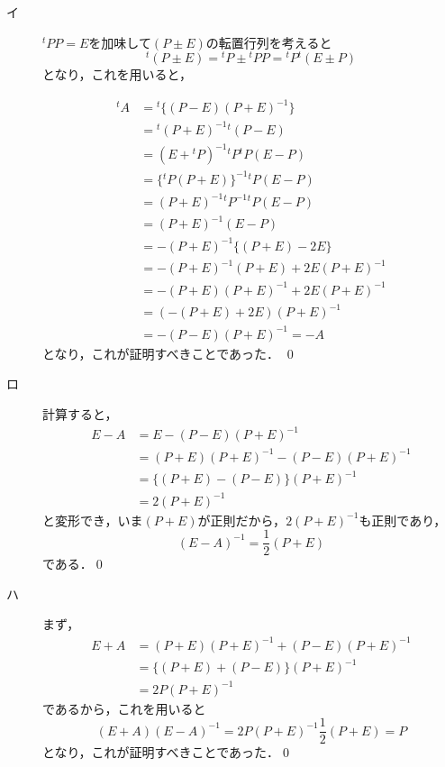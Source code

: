 \documentclass[uplatex,dvipdfmx,a4paper,10pt,fleqn]{jsarticle}
\begin{document}
\begin{leftbar}
    \begin{description}
        \item[イ] ${}^t PP =E$を加味して$(P \pm E)$の転置行列を考えると
        \[
           {}^t (P \pm E) = {}^t P \pm {}^t PP = {}^t P {}^t (E \pm P)
        \]
        となり，これを用いると，

        \begin{align*} 
            {}^t A & ={}^t  \{ (P-E)(P+E)^{-1} \} \\
            & = {}^t (P+E)^{-1} {}^t (P-E) \\
            & = (E+{}^t P)^{-1} {}^t P {}^t P (E-P) \\
            & = \{ {}^t P (P+E)  \}^{-1} {}^t P (E-P) \\
            & = (P+E)^{-1} {}^t P^{-1} {}^t P (E-P) \\
            & = (P+E)^{-1} (E-P) \\
            & = -(P+E)^{-1} \{ (P+E)-2E \} \\
            & = -(P+E)^{-1} (P+E) +2E (P+E)^{-1} \\
            & = -(P+E) (P+E)^{-1} +2E (P+E)^{-1} \\
            & = (-(P+E)+2E) (P+E)^{-1} \\
            & = -(P-E) (P+E)^{-1} = -A
        \end{align*} 
        となり，これが証明すべきことであった． \qed
        \item[ロ] 計算すると，
        \begin{align*} 
            E-A & = E-(P-E) (P+E)^{-1} \\
            & = (P+E)(P+E)^{-1} - (P-E) (P+E)^{-1} \\
            & = \{ (P+E)-(P-E) \} (P+E)^{-1} \\
            & = 2(P+E)^{-1}
        \end{align*} 
        と変形でき，いま$(P+E)$が正則だから，$2(P+E)^{-1}$も正則であり，
        \[
            (E-A)^{-1} = \frac{1}{2} (P+E)
        \]
        である．\qed
        \item[ハ] まず，
        \begin{align*}
            E+A &=(P+E)(P+E)^{-1}+(P-E) (P+E)^{-1} \\
            & = \{ (P+E)+(P-E) \} (P+E)^{-1} \\
            & = 2P (P+E)^{-1}
        \end{align*}
        であるから，これを用いると
        \[
            (E+A)(E-A)^{-1} = 2P (P+E)^{-1} \frac{1}{2} (P+E) =P
        \]
        となり，これが証明すべきことであった．\qed 
    \end{description}
\end{leftbar}
\end{document}
